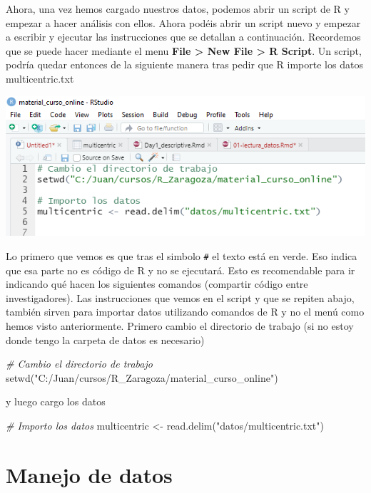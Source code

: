 \documentclass[
]{book}
\newenvironment{Shaded}{\begin{snugshade}}{\end{snugshade}}
\newcommand{\CommentTok}[1]{\textcolor[rgb]{0.56,0.35,0.01}{\textit{#1}}}
\newcommand{\FunctionTok}[1]{\textcolor[rgb]{0.00,0.00,0.00}{#1}}
\newcommand{\NormalTok}[1]{#1}
\newcommand{\OtherTok}[1]{\textcolor[rgb]{0.56,0.35,0.01}{#1}}
\newcommand{\StringTok}[1]{\textcolor[rgb]{0.31,0.60,0.02}{#1}}
\begin{document}
Ahora, una vez hemos cargado nuestros datos, podemos abrir un script de R y empezar a hacer análisis con ellos. Ahora podéis abrir un script nuevo y empezar a escribir y ejecutar las instrucciones que se detallan a continuación. Recordemos que se puede hacer mediante el menu \textbf{File \textgreater{} New File \textgreater{} R Script}. Un script, podría quedar entonces de la siguiente manera tras pedir que R importe los datos multicentric.txt

\includegraphics{figures/script.png}

Lo primero que vemos es que tras el simbolo \texttt{\#} el texto está en verde. Eso indica que esa parte no es código de R y no se ejecutará. Esto es recomendable para ir indicando qué hacen los siguientes comandos (compartir código entre investigadores). Las instrucciones que vemos en el script y que se repiten abajo, también sirven para importar datos utilizando comandos de R y no el menú como hemos visto anteriormente. Primero cambio el directorio de trabajo (si no estoy donde tengo la carpeta de datos es necesario)

\begin{Shaded}
\begin{Highlighting}[]
\CommentTok{\# Cambio el directorio de trabajo }
\FunctionTok{setwd}\NormalTok{(}\StringTok{"C:/Juan/cursos/R\_Zaragoza/material\_curso\_online"}\NormalTok{)}
\end{Highlighting}
\end{Shaded}

y luego cargo los datos

\begin{Shaded}
\begin{Highlighting}[]
\CommentTok{\# Importo los datos}
\NormalTok{multicentric }\OtherTok{\textless{}{-}} \FunctionTok{read.delim}\NormalTok{(}\StringTok{"datos/multicentric.txt"}\NormalTok{)}
\end{Highlighting}
\end{Shaded}

\hypertarget{manejo-de-datos}{%
\chapter{Manejo de datos}\label{manejo-de-datos}}
\end{document}
